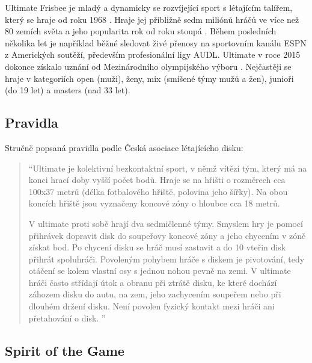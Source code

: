 \documentclass[thesis=B,czech]{FITthesis}[2012/06/26]
\begin{document}

\indent

Ultimate Frisbee je mladý a dynamicky se rozvíjející sport s létajícím talířem,
který se hraje od roku 1968 \cite{cald-o-ultimate}. Hraje jej přibližně sedm miliónů
hráčů ve více než 80 zemích světa a jeho popularita rok od roku stoupá \cite{usa-about-ultimate}.
Během posledních několika let je například běžné sledovat živé přenosy na sportovním kanálu ESPN
z Amerických soutěží, především profesionální ligy AUDL. Ultimate v roce 2015 dokonce získalo
uznání od Mezinárodního olympijského výboru \cite{cald-uznani}. Nejčastěji se hraje v kategoriích
open (muži), ženy, mix (smíšené týmy mužů a žen), junioři (do 19 let) a masters (nad 33 let).

\subsection{Pravidla}

Stručně popsaná pravidla podle Česká asociace lé\-ta\-jícícho disku:

\begin{quote}
``Ultimate je kolektivní bezkontaktní sport, v němž vítězí tým, který má na konci hrací doby
vyšší počet bodů. Hraje se na hřišti o rozměrech cca 100x37 metrů (délka fotbalového hřiště,
polovina jeho šířky). Na obou koncích hřiště jsou vyznačeny koncové zóny o hloubce cca 18 metrů.

V ultimate proti sobě hrají dva sedmičlenné týmy. Smyslem hry je pomocí přihrávek dopravit disk
do soupeřovy koncové zóny a jeho chycením v zóně získat bod. Po chycení disku se hráč musí
zastavit a do 10 vteřin disk přihrát spoluhráči. Povoleným pohybem hráče s diskem je pivotování,
tedy otáčení se kolem vlastní osy s jednou nohou pevně na zemi. V ultimate hráči často střídají
útok a obranu při ztrátě disku, ke které dochází záhozem disku do autu, na zem, jeho zachycením
soupeřem nebo při dlouhém držení disku. Není povolen fyzický kontakt mezi hráči ani přetahování
o disk.	''
\end{quote}


\subsection{Spirit of the Game}
\end{document}
